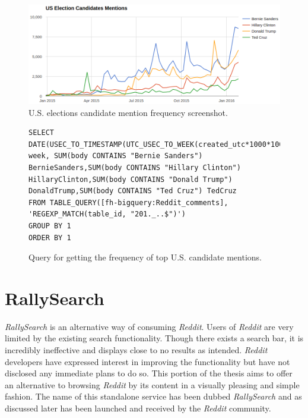\documentclass[msc,oneside]{ubcthesis}%
\begin{document}
\begin{figure}[H]
\includegraphics[width=\textwidth]{uselectionscreen.png}
\caption[U.S. elections candidate mention frequency]{
U.S. elections candidate mention frequency screenshot.}
\label{fig:uselectionsscreen}
\end{figure}

\begin{figure}[H]
\begin{center}
\begin{lstlisting}[showstringspaces=false]
SELECT DATE(USEC_TO_TIMESTAMP(UTC_USEC_TO_WEEK(created_utc*1000*1000,1))) week, SUM(body CONTAINS "Bernie Sanders") BernieSanders,SUM(body CONTAINS "Hillary Clinton") HillaryClinton,SUM(body CONTAINS "Donald Trump") DonaldTrump,SUM(body CONTAINS "Ted Cruz") TedCruz 
FROM TABLE_QUERY([fh-bigquery:Reddit_comments], 'REGEXP_MATCH(table_id, "201._..$")') 
GROUP BY 1 
ORDER BY 1
\end{lstlisting}
\end{center}
\caption[Query for getting the frequency of U.S. candidate mentions]{
Query for getting the frequency of top U.S. candidate mentions.}
\label{fig:ustopcand}
\end{figure}

\section{RallySearch}
\textit{RallySearch} is an alternative way of consuming \textit{Reddit}. Users of \textit{Reddit} are very limited by the existing search functionality. Though there exists a search bar, it is incredibly ineffective and displays close to no results as intended. \textit{Reddit} developers have expressed interest in improving the functionality but have not disclosed any immediate plans to do so. This portion of the thesis aims to offer an alternative to browsing \textit{Reddit} by its content in a visually pleasing and simple fashion. The name of this standalone service has been dubbed \textit{RallySearch} and as discussed later has been launched and received by the \textit{Reddit} community.
\end{document}
